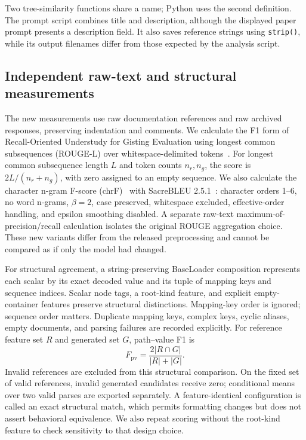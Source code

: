 Two tree-similarity functions share a name; Python uses the second definition. The prompt script combines title and description, although the displayed paper prompt presents a description field. It also saves reference strings using \texttt{strip()}, while its output filenames differ from those expected by the analysis script.

\subsection{Independent raw-text and structural measurements}
The new measurements use raw documentation references and raw archived responses, preserving indentation and comments. We calculate the F1 form of Recall-Oriented Understudy for Gisting Evaluation using longest common subsequences (ROUGE-L) over whitespace-delimited tokens~\cite{lin2004}. For longest common subsequence length $L$ and token counts $n_r,n_g$, the score is $2L/(n_r+n_g)$, with zero assigned to an empty sequence. We also calculate the character n-gram F-score (chrF)~\cite{popovic2015} with SacreBLEU 2.5.1~\cite{sacrebleu}: character orders 1--6, no word n-grams, $\beta=2$, case preserved, whitespace excluded, effective-order handling, and epsilon smoothing disabled. A separate raw-text maximum-of-precision/recall calculation isolates the original ROUGE aggregation choice. These new variants differ from the released preprocessing and cannot be compared as if only the model had changed.

For structural agreement, a string-preserving BaseLoader composition represents each scalar by its exact decoded value and its tuple of mapping keys and sequence indices. Scalar node tags, a root-kind feature, and explicit empty-container features preserve structural distinctions. Mapping-key order is ignored; sequence order matters. Duplicate mapping keys, complex keys, cyclic aliases, empty documents, and parsing failures are recorded explicitly. For reference feature set $R$ and generated set $G$, path--value F1 is
\[
 F_{\mathrm{pv}}=\frac{2|R\cap G|}{|R|+|G|}.
\]
Invalid references are excluded from this structural comparison. On the fixed set of valid references, invalid generated candidates receive zero; conditional means over two valid parses are exported separately. A feature-identical configuration is called an exact structural match, which permits formatting changes but does not assert behavioral equivalence. We also repeat scoring without the root-kind feature to check sensitivity to that design choice.

